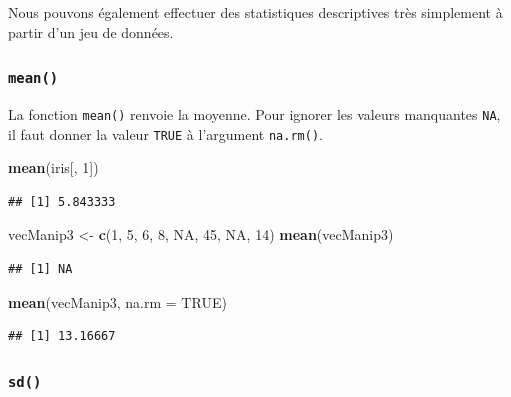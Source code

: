 \documentclass[]{book}
\newenvironment{Shaded}{\begin{snugshade}}{\end{snugshade}}
\newcommand{\DataTypeTok}[1]{\textcolor[rgb]{0.13,0.29,0.53}{#1}}
\newcommand{\DecValTok}[1]{\textcolor[rgb]{0.00,0.00,0.81}{#1}}
\newcommand{\KeywordTok}[1]{\textcolor[rgb]{0.13,0.29,0.53}{\textbf{#1}}}
\newcommand{\NormalTok}[1]{#1}
\newcommand{\OtherTok}[1]{\textcolor[rgb]{0.56,0.35,0.01}{#1}}
\newcommand{\StringTok}[1]{\textcolor[rgb]{0.31,0.60,0.02}{#1}}
\begin{document}
Nous pouvons également effectuer des statistiques descriptives très simplement à partir d'un jeu de données.

\hypertarget{l015mean}{%
\subsubsection{\texorpdfstring{\texttt{mean()}}{mean()}}\label{l015mean}}

La fonction \texttt{mean()} renvoie la moyenne. Pour ignorer les valeurs manquantes \texttt{NA}, il faut donner la valeur \texttt{TRUE} à l'argument \texttt{na.rm()}.

\begin{Shaded}
\begin{Highlighting}[]
\KeywordTok{mean}\NormalTok{(iris[, }\DecValTok{1}\NormalTok{])}
\end{Highlighting}
\end{Shaded}

\begin{verbatim}
## [1] 5.843333
\end{verbatim}

\begin{Shaded}
\begin{Highlighting}[]
\NormalTok{vecManip3 <-}\StringTok{ }\KeywordTok{c}\NormalTok{(}\DecValTok{1}\NormalTok{, }\DecValTok{5}\NormalTok{, }\DecValTok{6}\NormalTok{, }\DecValTok{8}\NormalTok{, }\OtherTok{NA}\NormalTok{, }\DecValTok{45}\NormalTok{, }\OtherTok{NA}\NormalTok{, }\DecValTok{14}\NormalTok{)}
\KeywordTok{mean}\NormalTok{(vecManip3)}
\end{Highlighting}
\end{Shaded}

\begin{verbatim}
## [1] NA
\end{verbatim}

\begin{Shaded}
\begin{Highlighting}[]
\KeywordTok{mean}\NormalTok{(vecManip3, }\DataTypeTok{na.rm =} \OtherTok{TRUE}\NormalTok{)}
\end{Highlighting}
\end{Shaded}

\begin{verbatim}
## [1] 13.16667
\end{verbatim}

\hypertarget{l015sd}{%
\subsubsection{\texorpdfstring{\texttt{sd()}}{sd()}}\label{l015sd}}
\end{document}
